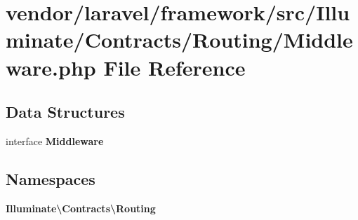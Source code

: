 \section{vendor/laravel/framework/src/\+Illuminate/\+Contracts/\+Routing/\+Middleware.php File Reference}
\label{_middleware_8php}
\subsection*{Data Structures}
\begin{DoxyCompactItemize}
\item 
interface {\bf Middleware}
\end{DoxyCompactItemize}
\subsection*{Namespaces}
\begin{DoxyCompactItemize}
\item 
 {\bf Illuminate\textbackslash{}\+Contracts\textbackslash{}\+Routing}
\end{DoxyCompactItemize}
